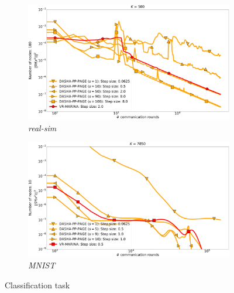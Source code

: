 \documentclass[12pt]{article}
\begin{document}
\begin{figure}[H]
    \begin{subfigure}{.5\textwidth}
        \includegraphics[width=\textwidth]{neurips_2022_finite_sum_real-sim_nof_500_numnodes_100_more_probs_batch_size_1.pdf}
        \caption{\textit{real-sim}}
    \end{subfigure}
    \begin{subfigure}{.5\textwidth}
        \includegraphics[width=\textwidth]{neurips_2022_finite_sum_mnist_nof_7850_numnodes_10_more_probs_batch_size_100_split_by_labels_logistic.pdf}
        \caption{\textit{MNIST}}
    \end{subfigure}
\caption{Classification task}
\label{fig:finite-sum}
\end{figure}

\end{document}
